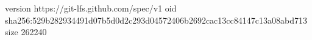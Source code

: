 version https://git-lfs.github.com/spec/v1
oid sha256:529b282934491d07b5d0d2c293d04572406b2692cac13cc84147c13a08abd713
size 262240
